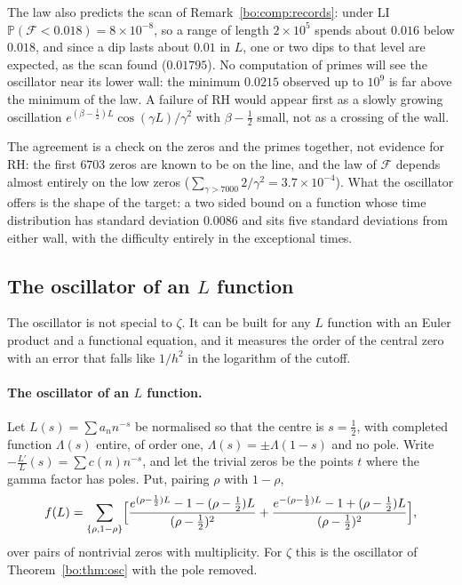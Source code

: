 The law also predicts the scan of Remark~\ref{bo:comp:records}: under LI $\mathbb P(\mathcal F<0.018)=8\times10^{-8}$, so a range of length $2\times10^5$ spends about $0.016$ below $0.018$, and since a dip lasts about $0.01$ in $L$, one or two dips to that level are expected, as the scan found ($0.01795$). No computation of primes will see the oscillator near its lower wall: the minimum $0.0215$ observed up to $10^9$ is far above the minimum of the law. A failure of RH would appear first as a slowly growing oscillation $e^{(\beta-\frac12)L}\cos(\gamma L)/\gamma^2$ with $\beta-\frac12$ small, not as a crossing of the wall.

The agreement is a check on the zeros and the primes together, not evidence for RH: the first $6703$ zeros are known to be on the line, and the law of $\mathcal F$ depends almost entirely on the low zeros ($\sum_{\gamma>7000}2/\gamma^2=3.7\times10^{-4}$). What the oscillator offers is the shape of the target: a two sided bound on a function whose time distribution has standard deviation $0.0086$ and sits five standard deviations from either wall, with the difficulty entirely in the exceptional times.

\subsection{The oscillator of an $L$ function}\label{bo:sec:oscopen}

The oscillator is not special to $\zeta$. It can be built for any $L$ function with an Euler product and a functional equation, and it measures the order of the central zero with an error that falls like $1/h^2$ in the logarithm of the cutoff.

\paragraph{The oscillator of an $L$ function.} Let $L(s)=\sum a_nn^{-s}$ be normalised so that the centre is $s=\frac12$, with completed function $\Lambda(s)$ entire, of order one, $\Lambda(s)=\pm\Lambda(1-s)$ and no pole. Write $-\frac{L'}{L}(s)=\sum c(n)n^{-s}$, and let the trivial zeros be the points $t$ where the gamma factor has poles. Put, pairing $\rho$ with $1-\rho$,
\[
f(L)=\sum_{\{\rho,1-\rho\}}\Bigl[\frac{e^{(\rho-\frac12)L}-1-(\rho-\frac12)L}{(\rho-\frac12)^2}+\frac{e^{-(\rho-\frac12)L}-1+(\rho-\frac12)L}{(\rho-\frac12)^2}\Bigr],
\]
over pairs of nontrivial zeros with multiplicity. For $\zeta$ this is the oscillator of Theorem~\ref{bo:thm:osc} with the pole removed.

